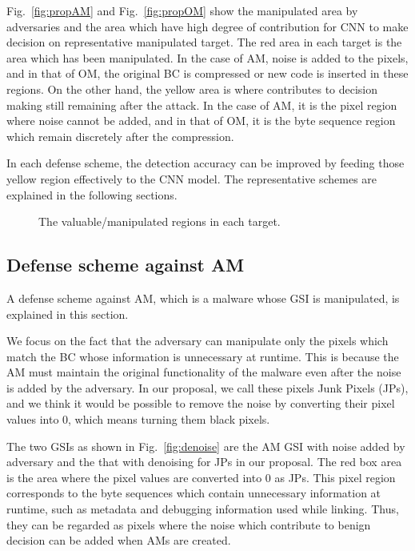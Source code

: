 \documentclass{ieeeaccess}
\newcommand{\myfigurename}{Fig.}
\begin{document}
\myfigurename~\ref{fig:propAM} and \myfigurename~\ref{fig:propOM} show the manipulated area by adversaries and the area which have high degree of contribution for CNN to make decision on representative manipulated target.
The red area in each target is the area which has been manipulated.
In the case of AM, noise is added to the pixels, and in that of OM, the original BC is compressed or new code is inserted in these regions.
On the other hand, the yellow area is where contributes to decision making still remaining after the attack.
In the case of AM, it is the pixel region where noise cannot be added, and in that of OM, it is the byte sequence region which remain discretely after the compression.

In each defense scheme, the detection accuracy can be improved by feeding those yellow region effectively to the CNN model.
The representative schemes are explained in the following sections.

\begin{figure}[t]
 \centering
 \caption{The valuable/manipulated regions in each target.} 
 \label{fig:prop}
\end{figure}

\subsection{Defense scheme against AM}
A defense scheme against AM, which is a malware whose GSI is manipulated, is explained in this section.

We focus on the fact that the adversary can manipulate only the pixels which match the BC whose information is unnecessary at runtime.
This is because the AM must maintain the original functionality of the malware even after the noise is added by the adversary.
In our proposal, we call these pixels Junk Pixels (JPs), and we think it would be possible to remove the noise by converting their pixel values into 0, which means turning them black pixels.

The two GSIs as shown in \myfigurename~\ref{fig:denoise} are the AM GSI with noise added by adversary and the that with denoising for JPs in our proposal.
The red box area is the area where the pixel values are converted into 0 as JPs.
This pixel region corresponds to the byte sequences which contain unnecessary information at runtime, such as metadata and debugging information used while linking.
Thus, they can be regarded as pixels where the noise which contribute to benign decision can be added when AMs are created.
\end{document}
